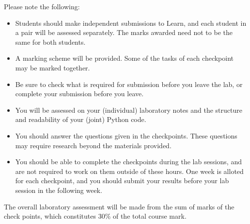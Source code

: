 Please note the following:
\begin{itemize}
\item Students should make independent submissions to Learn, and each student in a pair will be assessed separately. The marks awarded need not to be the same for both students.
\item A marking scheme will be provided. Some of the tasks of each checkpoint may be marked together.
\item Be sure to check what is required for submission before you leave the lab, or complete your submission before you leave.
\item You will be assessed on your (individual) laboratory notes and the structure and readability of your (joint) Python code.
\item You should answer the questions given in the checkpoints. These questions may require research beyond the materials provided.
\item You should be able to complete the checkpoints during the lab sessions, and are not required to work on them outside of these hours.
One week is alloted for each checkpoint, and you should submit your results before your lab session in the following week.
\end{itemize}

The overall laboratory assessment will be made from the sum of marks of the check points, which constitutes 30\% of the total course mark.

